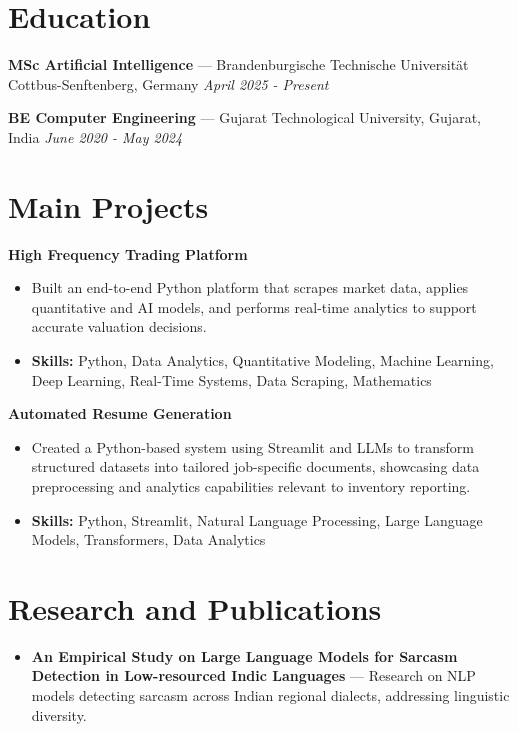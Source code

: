 \documentclass[a4paper,10pt]{article}
\begin{document}
\section*{Education}
\textbf{MSc Artificial Intelligence} — Brandenburgische Technische Universität Cottbus-Senftenberg, Germany \hfill \textit{April 2025 - Present}\par
\vspace{1.5pt}
\textbf{BE Computer Engineering} — Gujarat Technological University, Gujarat, India \hfill \textit{June 2020 - May 2024}\par

\section*{Main Projects}
\textbf{High Frequency Trading Platform}\par
\vspace{1pt}
\begin{itemize}
  \item Built an end-to-end Python platform that scrapes market data, applies quantitative and AI models, and performs real-time analytics to support accurate valuation decisions.
  \item \textbf{Skills:} Python, Data Analytics, Quantitative Modeling, Machine Learning, Deep Learning, Real-Time Systems, Data Scraping, Mathematics
\end{itemize}
\vspace{3pt}
\textbf{Automated Resume Generation}\par
\vspace{1pt}
\begin{itemize}
  \item Created a Python-based system using Streamlit and LLMs to transform structured datasets into tailored job-specific documents, showcasing data preprocessing and analytics capabilities relevant to inventory reporting.
  \item \textbf{Skills:} Python, Streamlit, Natural Language Processing, Large Language Models, Transformers, Data Analytics
\end{itemize}

\section*{Research and Publications}
\begin{itemize}
\item \textbf{An Empirical Study on Large Language Models for Sarcasm Detection in Low-resourced Indic Languages} — Research on NLP models detecting sarcasm across Indian regional dialects, addressing linguistic diversity.
\end{itemize}
\end{document}
